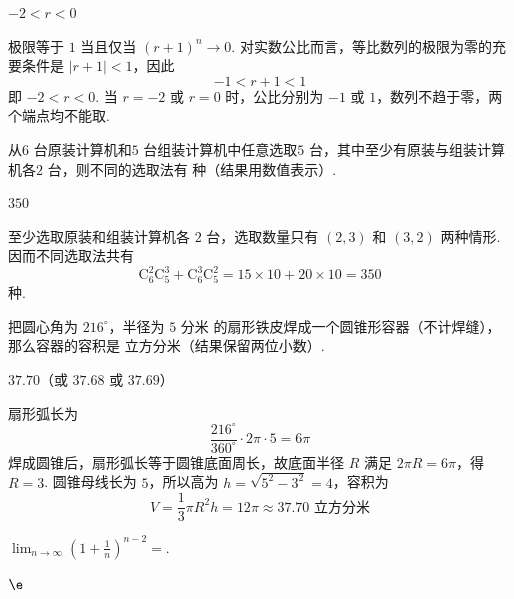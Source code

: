 \begin{answer}
\(-2<r<0\)
\end{answer}

\begin{solution}
极限等于 \(1\) 当且仅当 \((r+1)^n\to0\). 对实数公比而言，等比数列的极限为零的充要条件是 \(|r+1|<1\)，因此
\[
-1<r+1<1
\]
即 \(-2<r<0\). 当 \(r=-2\) 或 \(r=0\) 时，公比分别为 \(-1\) 或 \(1\)，数列不趋于零，两个端点均不能取.
\end{solution}

\begin{problem}[A]
从\(6\text{ 台}\)原装计算机和\(5\text{ 台}\)组装计算机中任意选取\(5\text{ 台}\)，其中至少有原装与组装计算机各\(2\text{ 台}\)，则不同的选取法有\fillinblank{} 种（结果用数值表示）.
\end{problem}

\begin{answer}
\(350\)
\end{answer}

\begin{solution}
至少选取原装和组装计算机各 \(2\) 台，选取数量只有 \((2,3)\) 和 \((3,2)\) 两种情形. 因而不同选取法共有
\[
\mathrm C_6^2\mathrm C_5^3+\mathrm C_6^3\mathrm C_5^2=15\times10+20\times10=350
\]
种.
\end{solution}

\begin{problem}[A]
把圆心角为 \(216^{\circ} \)，半径为 \(5\text{ 分米}\) 的扇形铁皮焊成一个圆锥形容器（不计焊缝），那么容器的容积是\fillinblank{} \(\text{立方分米}\)（结果保留两位小数）.
\end{problem}

\begin{answer}
\(37.70\)（或 \(37.68\) 或 \(37.69\)）
\end{answer}

\begin{solution}
扇形弧长为
\[
\frac{216^{\circ}}{360^{\circ}}\cdot2\pi\cdot5=6\pi
\]
焊成圆锥后，扇形弧长等于圆锥底面周长，故底面半径 \(R\) 满足 \(2\pi R=6\pi\)，得 \(R=3\). 圆锥母线长为 \(5\)，所以高为 \(h=\sqrt{5^2-3^2}=4\)，容积为
\[
V=\frac13\pi R^2h=12\pi\approx37.70\text{ 立方分米}
\]
\end{solution}

\setcounter{probnum}{17}
\begin{problem}[B]
\(\displaystyle\lim_{n\to\infty}\left(1+\frac{1}{n}\right)^{n-2}=\)\fillinblank{}.
\end{problem}

\begin{answer}
\(\e\)
\end{answer}

